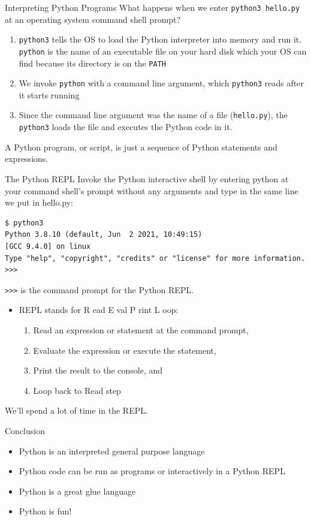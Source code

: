 \documentclass[smaller, aspectratio=1610]{beamer}
\begin{document}
\begin{frame}[label={sec:orgde7aa3a},fragile]{Interpreting Python Programs}
 What happens when we enter \texttt{python3 hello.py} at an operating system command shell prompt?

\begin{enumerate}
\item \texttt{python3} tells the OS to load the Python interpreter into memory and run it. \texttt{python} is the name of an executable file on your hard disk which your OS can find because its directory is on the \texttt{PATH}
\item We invoke \texttt{python} with a \alert{command line argument}, which \texttt{python3} reads after it starts running
\item Since the command line argument was the name of a file (\texttt{hello.py}), the \texttt{python3} loads the file and executes the Python code in it.
\end{enumerate}

A Python program, or script, is just a sequence of Python statements and expressions.
\end{frame}

\begin{frame}[label={sec:org1810218},fragile]{The Python REPL}
 Invoke the Python interactive shell by entering python at your command shell’s prompt without any arguments and type in the same line we put in hello.py:

\lstset{language=sh,label= ,caption= ,captionpos=b,numbers=none}
\begin{lstlisting}
$ python3
Python 3.8.10 (default, Jun  2 2021, 10:49:15)
[GCC 9.4.0] on linux
Type "help", "copyright", "credits" or "license" for more information.
>>>
\end{lstlisting}

\texttt{>>>} is the command prompt for the Python REPL.

\begin{itemize}
\item REPL stands for \alert{R} ead \alert{E} val \alert{P} rint \alert{L} oop:
\begin{enumerate}
\item \alert{Read} an expression or statement at the command prompt,
\item \alert{Evaluate} the expression or execute the statement,
\item \alert{Print} the result to the console, and
\item \alert{Loop} back to \alert{Read} step
\end{enumerate}
\end{itemize}

We’ll spend a lot of time in the REPL.
\end{frame}

\begin{frame}[label={sec:orgdf658a6}]{Conclusion}
\begin{itemize}
\item Python is an interpreted general purpose language

\item Python code can be run as programs or interactively in a Python REPL

\item Python is a great glue language

\item Python is fun!
\end{itemize}
\end{frame}
\end{document}
